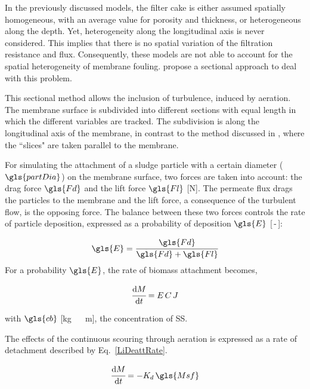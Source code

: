 In the previously discussed models, the filter cake is either assumed spatially homogeneous, with an average value for porosity and thickness, or heterogeneous along the depth. Yet, heterogeneity along the longitudinal axis is never considered. This implies that there is no spatial variation of the filtration resistance and flux. Consequently, these models are not able to account for the spatial heterogeneity of membrane fouling. \cite{Li2006} propose a sectional approach to deal with this problem. \par
This sectional method allows the inclusion of turbulence, induced by aeration. The membrane surface is subdivided into different sections with equal length in which the different variables are tracked. The subdivision is along the longitudinal axis of the membrane, in contrast to the method discussed in \cite{Yoon1999}, where the ``slices" are taken parallel to the membrane. \par
For simulating the attachment of a sludge particle with a certain diameter ($\gls{partDia}$) on the membrane surface, two forces are taken into account: the drag force $\gls{Fd}$ and the lift force $\gls{Fl}$ [\unit{\newton}]. The permeate flux drags the particles to the membrane and the lift force, a consequence of the turbulent flow, is the opposing force. The balance between these two forces controls the rate of particle deposition, expressed as a probability of deposition $\gls{E}$ [\,-\,]: \par
\begin{equation}
\gls{E}=\cfrac{\gls{Fd}}{\gls{Fd}+\gls{Fl}}
\label{Prob}
\end{equation}
For a probability $\gls{E}$, the rate of biomass attachment becomes, 

\begin{equation}
\cfrac{\mathrm{d} M}{\mathrm{d} t} = E\, C\, J
\label{LiAttRate}
\end{equation}

with $\gls{cb}$ [\unit{\kilogram\, \rpcubic\metre}], the concentration of \gls{SS}.\par

The effects of the continuous scouring through aeration is expressed as a rate of detachment described by Eq.\ \ref{LiDeattRate}.

\begin{equation}
\cfrac{\mathrm{d} M}{\mathrm{d} t} = -K_d \, \gls{Msf}
\label{LiDeattRate}
\end{equation}
 

